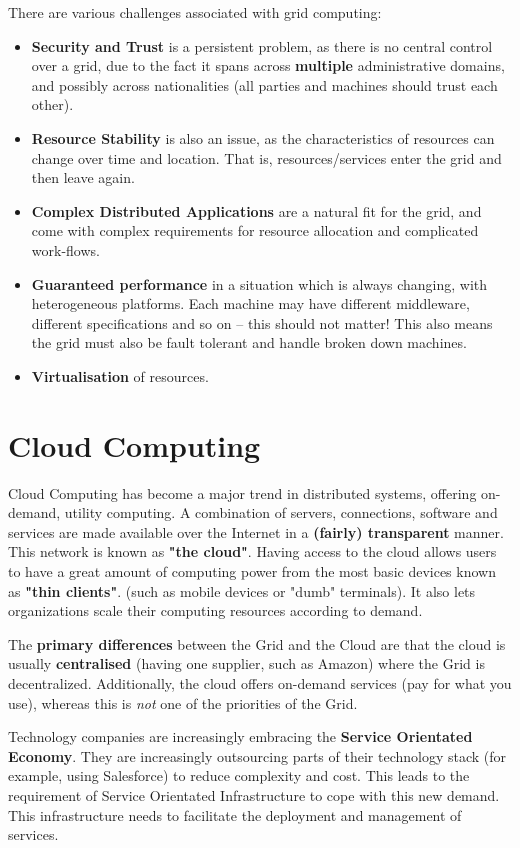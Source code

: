 \documentclass{article}
\begin{document}
There are various challenges associated with grid computing:
\begin{itemize}
	\item \textbf{Security and Trust} is a persistent problem, as there is no central control over a grid, due to the fact it spans across \textbf{multiple} administrative domains, and possibly across nationalities (all parties and machines should trust each other).
	\item \textbf{Resource Stability} is also an issue, as the characteristics of resources can change over time and location. That is, resources/services enter the grid and then leave again.
	\item \textbf{Complex Distributed Applications} are a natural fit for the grid, and come with complex requirements for resource allocation and complicated work-flows.
	\item \textbf{Guaranteed performance} in a situation which is always changing, with heterogeneous platforms. Each machine may have different middleware, different specifications and so on -- this should not matter! This also means the grid must also be fault tolerant and handle broken down machines.
	\item \textbf{Virtualisation} of resources.
\end{itemize}


\section{Cloud Computing}

Cloud Computing has become a major trend in distributed systems, offering on-demand, utility computing. A combination of servers, connections, software and services are made available over the Internet in a \textbf{(fairly) transparent} manner. This network is known as \textbf{"the cloud"}. Having access to the cloud allows users to have a great amount of computing power from the most basic devices known as \textbf{"thin clients"}. (such as mobile devices or "dumb" terminals). It also lets organizations scale their computing resources according to demand.

The \textbf{primary differences} between the Grid and the Cloud are that the cloud is usually \textbf{centralised} (having one supplier, such as Amazon) where the Grid is decentralized. Additionally, the cloud offers on-demand services (pay for what you use), whereas this is \textit{not} one of the priorities of the Grid.

Technology companies are increasingly embracing the \textbf{Service Orientated Economy}. They are increasingly outsourcing parts of their technology stack (for example, using Salesforce) to reduce complexity and cost. This leads to the requirement of Service Orientated Infrastructure to cope with this new demand. This infrastructure needs to facilitate the deployment and management of services.
\end{document}
